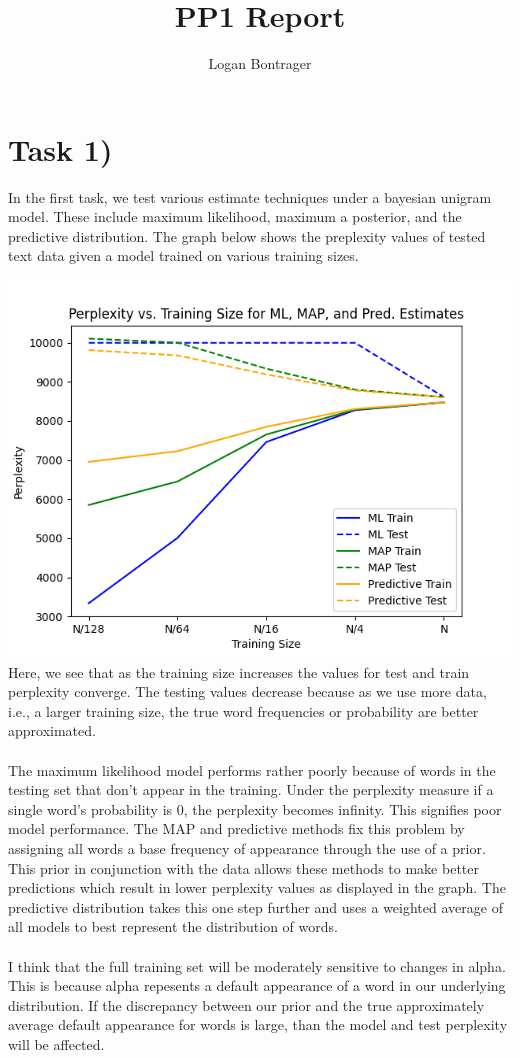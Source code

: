 \documentclass{article}
\begin{document}
\title{PP1 Report}
\author{Logan Bontrager}
\maketitle

\section*{Task 1)}

In the first task, we test various estimate techniques under a bayesian unigram model. These include maximum likelihood, maximum a posterior, and the predictive distribution. The graph below shows the preplexity values of tested text data given a model trained on various training sizes.

\includegraphics[width=\textwidth]{../output/task1.png}
Here, we see that as the training size increases the values for test and train perplexity converge. The testing values decrease because as we use more data, i.e., a larger training size, the true word frequencies or probability are better approximated. 
\\ \\
The maximum likelihood model performs rather poorly because of words in the testing set that don't appear in the training. Under the perplexity measure if a single word's probability is 0, the perplexity becomes infinity. This signifies poor model performance. The MAP and predictive methods fix this problem by assigning all words a base frequency of appearance through the use of a prior. This prior in conjunction with the data allows these methods to make better predictions which result in lower perplexity values as displayed in the graph. The predictive distribution takes this one step further and uses a weighted average of all models to best represent the distribution of words.
\\ \\
I think that the full training set will be moderately sensitive to changes in alpha. This is because alpha repesents a default appearance of a word in our underlying distribution. If the discrepancy between our prior and the true approximately average default appearance for words is large, than the model and test perplexity will be affected.
\end{document}
